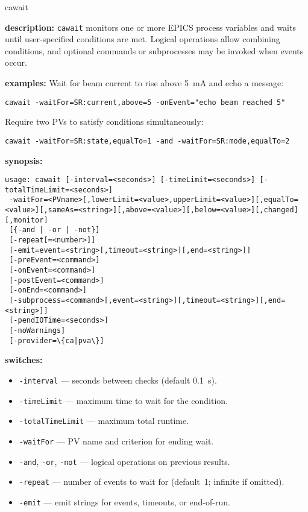 \begin{sddsprog}{cawait}
\item \textbf{description:}
\verb+cawait+ monitors one or more EPICS process variables and waits until
user-specified conditions are met. Logical operations allow combining
conditions, and optional commands or subprocesses may be invoked when
events occur.
\item \textbf{examples:}
Wait for beam current to rise above 5~mA and echo a message:
\begin{verbatim}
cawait -waitFor=SR:current,above=5 -onEvent="echo beam reached 5"
\end{verbatim}
Require two PVs to satisfy conditions simultaneously:
\begin{verbatim}
cawait -waitFor=SR:state,equalTo=1 -and -waitFor=SR:mode,equalTo=2
\end{verbatim}
\item \textbf{synopsis:}
\begin{verbatim}
usage: cawait [-interval=<seconds>] [-timeLimit=<seconds>] [-totalTimeLimit=<seconds>]
 -waitFor=<PVname>[,lowerLimit=<value>,upperLimit=<value>][,equalTo=<value>][,sameAs=<string>][,above=<value>][,below=<value>][,changed][,monitor]
 [{-and | -or | -not}]
 [-repeat[=<number>]]
 [-emit=event=<string>[,timeout=<string>][,end=<string>]]
 [-preEvent=<command>]
 [-onEvent=<command>]
 [-postEvent=<command>]
 [-onEnd=<command>]
 [-subprocess=<command>[,event=<string>][,timeout=<string>][,end=<string>]]
 [-pendIOTime=<seconds>]
 [-noWarnings]
 [-provider=\{ca|pva\}]
\end{verbatim}
\item \textbf{switches:}
\begin{itemize}
  \item {\tt -interval} --- seconds between checks (default 0.1~s).
  \item {\tt -timeLimit} --- maximum time to wait for the condition.
  \item {\tt -totalTimeLimit} --- maximum total runtime.
  \item {\tt -waitFor} --- PV name and criterion for ending wait.
  \item {\tt -and}, {\tt -or}, {\tt -not} --- logical operations on previous results.
  \item {\tt -repeat} --- number of events to wait for (default~1; infinite if omitted).
  \item {\tt -emit} --- emit strings for events, timeouts, or end-of-run.

\end{itemize}
\end{sddsprog}
